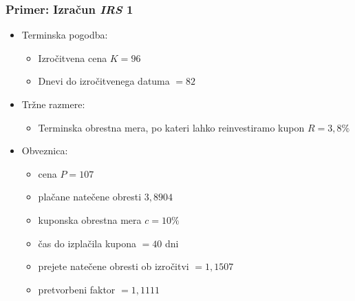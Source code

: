 \documentclass[14pt]{beamer}
\begin{document}
\begin{frame}
    \frametitle{Primer: Izračun \textit{IRS} 1}
    
    \begin{itemize}
        \item Terminska pogodba: 
        
                \begin{itemize}
                    \item Izročitvena cena $K = 96$
                    \item Dnevi do izročitvenega datuma $= 82$
                \end{itemize}

        \item Tržne razmere:
        
                \begin{itemize}
                    \item Terminska obrestna mera, po kateri lahko reinvestiramo
                            kupon $R = 3,8\%$
                \end{itemize}

        \item Obveznica:
        
                \begin{itemize}
                    \item cena $P = 107$
                    \item plačane natečene obresti $3,8904$
                    \item kuponska obrestna mera $c = 10\%$
                    \item čas do izplačila kupona $ = 40$ dni
                    \item prejete natečene obresti ob izročitvi $ = 1,1507$
                    \item pretvorbeni faktor $ = 1,1111$
                \end{itemize}

    \end{itemize}

    \note[item]{}

\end{frame}
\end{document}
